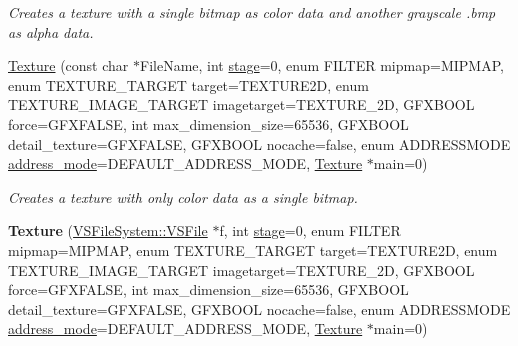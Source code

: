 \begin{DoxyCompactItemize}
\begin{DoxyCompactList}\small\item\em Creates a texture with a single bitmap as color data and another grayscale .bmp as alpha data. \end{DoxyCompactList}\item 
\hyperlink{classTexture_ab99bca7c7a33ab105a90cbedbb911011}{Texture} (const char $\ast$File\+Name, int \hyperlink{classTexture_aa38999434f9fcf409ca20b4523852b7b}{stage}=0, enum F\+I\+L\+T\+ER mipmap=M\+I\+P\+M\+AP, enum T\+E\+X\+T\+U\+R\+E\+\_\+\+T\+A\+R\+G\+ET target=T\+E\+X\+T\+U\+R\+E2D, enum T\+E\+X\+T\+U\+R\+E\+\_\+\+I\+M\+A\+G\+E\+\_\+\+T\+A\+R\+G\+ET imagetarget=T\+E\+X\+T\+U\+R\+E\+\_\+2D, G\+F\+X\+B\+O\+OL force=G\+F\+X\+F\+A\+L\+SE, int max\+\_\+dimension\+\_\+size=65536, G\+F\+X\+B\+O\+OL detail\+\_\+texture=G\+F\+X\+F\+A\+L\+SE, G\+F\+X\+B\+O\+OL nocache=false, enum A\+D\+D\+R\+E\+S\+S\+M\+O\+DE \hyperlink{classTexture_af3605a5ea18f32b7669cf0db94b12fe6}{address\+\_\+mode}=D\+E\+F\+A\+U\+L\+T\+\_\+\+A\+D\+D\+R\+E\+S\+S\+\_\+\+M\+O\+DE, \hyperlink{classTexture}{Texture} $\ast$main=0)\hypertarget{classTexture_ab99bca7c7a33ab105a90cbedbb911011}{}\label{classTexture_ab99bca7c7a33ab105a90cbedbb911011}

\begin{DoxyCompactList}\small\item\em Creates a texture with only color data as a single bitmap. \end{DoxyCompactList}\item 
{\bfseries Texture} (\hyperlink{classVSFileSystem_1_1VSFile}{V\+S\+File\+System\+::\+V\+S\+File} $\ast$f, int \hyperlink{classTexture_aa38999434f9fcf409ca20b4523852b7b}{stage}=0, enum F\+I\+L\+T\+ER mipmap=M\+I\+P\+M\+AP, enum T\+E\+X\+T\+U\+R\+E\+\_\+\+T\+A\+R\+G\+ET target=T\+E\+X\+T\+U\+R\+E2D, enum T\+E\+X\+T\+U\+R\+E\+\_\+\+I\+M\+A\+G\+E\+\_\+\+T\+A\+R\+G\+ET imagetarget=T\+E\+X\+T\+U\+R\+E\+\_\+2D, G\+F\+X\+B\+O\+OL force=G\+F\+X\+F\+A\+L\+SE, int max\+\_\+dimension\+\_\+size=65536, G\+F\+X\+B\+O\+OL detail\+\_\+texture=G\+F\+X\+F\+A\+L\+SE, G\+F\+X\+B\+O\+OL nocache=false, enum A\+D\+D\+R\+E\+S\+S\+M\+O\+DE \hyperlink{classTexture_af3605a5ea18f32b7669cf0db94b12fe6}{address\+\_\+mode}=D\+E\+F\+A\+U\+L\+T\+\_\+\+A\+D\+D\+R\+E\+S\+S\+\_\+\+M\+O\+DE, \hyperlink{classTexture}{Texture} $\ast$main=0)\hypertarget{classTexture_ac3709238a9d466ffe0e0c76e07ba8985}{}\label{classTexture_ac3709238a9d466ffe0e0c76e07ba8985}


\end{DoxyCompactItemize}
